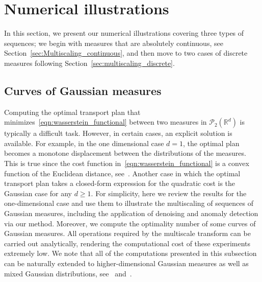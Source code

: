\documentclass[12pt]{amsart}
\begin{document}
\section{Numerical illustrations}\label{sec:numerical_illustrations}

In this section, we present our numerical illustrations covering three types of sequences; we begin with measures that are absolutely continuous, see Section~\ref{sec:Multiscaling_continuous}, and then move to two cases of discrete measures following Section~\ref{sec:multiscaling_discrete}.

\subsection{Curves of Gaussian measures}

Computing the optimal transport plan that minimizes~\eqref{eqn:wasserstein_functional} between two measures in $\mathcal{P}_2(\mathbb{R}^d)$ is typically a difficult task. However, in certain cases, an explicit solution is available. For example, in the one dimensional case $d=1$, the optimal plan becomes a monotone displacement between the distributions of the measures. This is true since the cost function in~\eqref{eqn:wasserstein_functional} is a convex function of the Euclidean distance, see~\cite{villani2021topics}. Another case in which the optimal transport plan takes a closed-form expression for the quadratic cost is the Gaussian case for any $d\geq1$. For simplicity, here we review the results for the one-dimensional case and use them to illustrate the multiscaling of sequences of Gaussian measures, including the application of denoising and anomaly detection via our method. Moreover, we compute the optimality number of some curves of Gaussian measures. All operations required by the multiscale transform can be carried out analytically, rendering the computational cost of these experiments extremely low. We note that all of the computations presented in this subsection can be naturally extended to higher-dimensional Gaussian measures as well as mixed Gaussian distributions, see~\cite[Chapter 1.6.3]{panaretos2020invitation} and~\cite{chen2018optimal}.
\end{document}
